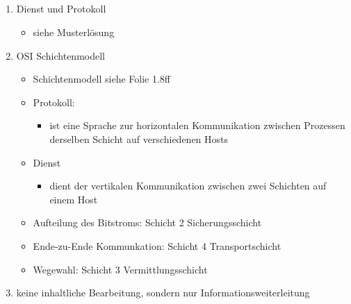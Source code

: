 \subsection{}
\begin{enumerate}
	\item Dienst und Protokoll
	\begin{itemize}
		\item siehe Musterlösung
	\end{itemize}
	\item OSI Schichtenmodell
	\begin{itemize}
		\item Schichtenmodell siehe Folie 1.8ff
		\item Protokoll:
		\begin{itemize}
			\item ist eine Sprache zur horizontalen Kommunikation 							zwischen Prozessen derselben Schicht auf verschiedenen 						Hosts
		\end{itemize}
		\item Dienst
		\begin{itemize}
			\item dient der vertikalen Kommunikation zwischen zwei 							Schichten auf einem Host
		\end{itemize}
		\item Aufteilung des Bitstroms: Schicht 2 Sicherungsschicht
		\item Ende-zu-Ende Kommunkation: Schicht 4 Transportschicht
		\item Wegewahl: Schicht 3 Vermittlungsschicht
	\end{itemize}
	\item keine inhaltliche Bearbeitung, sondern nur 								Informationsweiterleitung
\end{enumerate}

